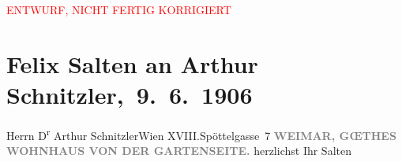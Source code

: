 
\begin{center}
            \textcolor{red}{ENTWURF, NICHT FERTIG KORRIGIERT}
                      \end{center}
            
         \renewcommand{\erwaehnteOrte}{Orte: Edmund-Weiß-Gasse 7, Goethes Wohnhaus, Weimar, Wien, XVIII., Währing}
         \renewcommand{\erwaehnteWerke}{}
               \section[ Felix Salten an Arthur Schnitzler, 9. 6. 1906]{ Felix Salten an Arthur Schnitzler, 9. 6. 1906}\nopagebreak{}\rehead{ }\begin{ledgroupsized}[t]{13cm}\normalsize\beginnumbering \toendnotes[C]{\smallbreak\pagebreak[2]} 
\pstart{}{\pb}Herrn D\textsuperscript{r} Arthur Schnitzler\pend{}\pstart{}Wien XVIII.\pend{}\pstart{}Spöttelgasse 7\pend{}{\bigskip}\pstart
           \noindent{}\centering{}{\pb}\textcolor{gray}{\textbf{\textbf{WEIMAR}, GŒTHES WOHNHAUS VON DER
                        GARTENSEITE.}}\pend
           \pstart
           herzlichst Ihr \spacefill\mbox{Salten}\pend
           
         
         \endnumbering{}\end{ledgroupsized}  \newcommand{\dateiname}{L03424}\newcommand{\titel}{Felix Salten an Arthur Schnitzler, 9. 6. 1906}\newcommand{\editorInnen}{Martin Anton Müller und Laura Untner}
      